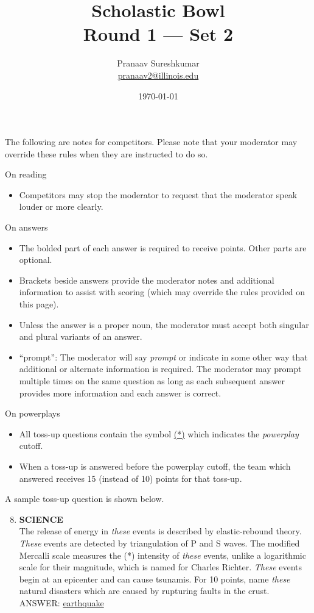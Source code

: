 \documentclass{report}
\title{\textbf{Scholastic Bowl} \\ Round 1 --- Set 2}
\author{Pranaav Sureshkumar \\ \href{mailto:pranaav2@illinois.edu}{pranaav2@illinois.edu}}
\date{\today}
\begin{document}
\thispagestyle{empty}
The following are notes for competitors. Please note that your moderator may override these rules when they are instructed to do so.

\vspace*{0.3 cm}
On reading
\begin{itemize}
    \item Competitors may stop the moderator to request that the moderator speak louder or more clearly.
\end{itemize}

\vspace*{0.3 cm}
On answers
\begin{itemize}
    \item The bolded part of each answer is required to receive points. Other parts are optional.
    \item Brackets beside answers provide the moderator notes and additional information to assist with scoring (which may override the rules provided on this page).
    \item Unless the answer is a proper noun, the moderator must accept both singular and plural variants of an answer. 
    \item ``prompt'': The moderator will say \textit{prompt} or indicate in some other way that additional or alternate information is required. The moderator may prompt multiple times on the same question as long as each subsequent answer provides more information and each answer is correct.
\end{itemize}

\vspace*{0.3 cm}
On powerplays
\begin{itemize}
    \item All toss-up questions contain the symbol \underline{(*)} which indicates the \textit{powerplay} cutoff.
    \item When a toss-up is answered before the powerplay cutoff, the team which answered receives 15 (instead of 10) points for that toss-up.
\end{itemize}

\vspace*{0.3 cm}
A sample toss-up question is shown below.

\begin{mdframed}[style=sample]
    \begin{enumerate}
        \setcounter{enumi}{7}
        \item \textbf{SCIENCE} \\ The release of energy in \textit{these} events is described by elastic-rebound theory. \textit{These} events are detected by triangulation of P and S waves. The modified Mercalli scale measures the (*) intensity of \textit{these} events, unlike a logarithmic scale for their magnitude, which is named for Charles Richter. \textit{These} events begin at an epicenter and can cause tsunamis. For 10 points, name \textit{these} natural disasters which are caused by rupturing faults in the crust. \\ ANSWER: \underline{earthquake}
    \end{enumerate}
    \end{mdframed}
\end{document}

